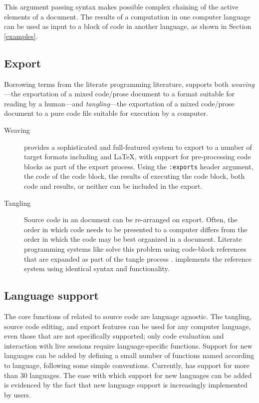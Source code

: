 \documentclass[article,shortnames]{jss}
\begin{document}
This argument passing syntax makes possible complex chaining of the
active elements of a document.  The results of a computation in one
computer language can be used as input to a block of code in another
language, as shown in Section \ref{examples}.
\subsection{Export}
\label{sec-3-3}
\label{export}


Borrowing terms from the literate programming literature, 
supports both \emph{weaving}---the exportation of a mixed code/prose
document to a format suitable for reading by a human---and
\emph{tangling}---the exportation of a mixed code/prose document to a pure
code file suitable for execution by a computer.

\begin{description}
\item[Weaving]  provides a sophisticated and full-featured
     system to export to a number of target formats including  and \LaTeX{},
     with support for pre-processing code blocks as part of
     the export process.  Using the \texttt{:exports} header argument, the
     code of the code block, the results of executing the code block,
     both code and results, or neither can be included in the export.
\item[Tangling] Source code in an  document can be re-arranged
     on export.  Often, the order in which code needs to be
     presented to a computer differs from the order in which the code may
     be best organized in a document.  Literate programming systems
     like  solve this problem using code-block references that
     are expanded as part of the tangle process \citep{noweb}.
      implements the  reference system using
     identical syntax and functionality.
\end{description}
\subsection{Language support}
\label{sec-3-4}
\label{languages}


The core functions of  related to source code are language
agnostic.  The tangling, source code editing, and export features can be
used for any computer language, even those that are not specifically
supported; only code evaluation and interaction with live sessions
require language-specific functions.  Support for new languages can be
added by defining a small number of  functions named
according to language, following some simple conventions.  Currently,
 has support for more than 30 languages.  The ease with which
support for new languages can be added is evidenced by the fact that
new language support is increasingly implemented by  users.
\end{document}
